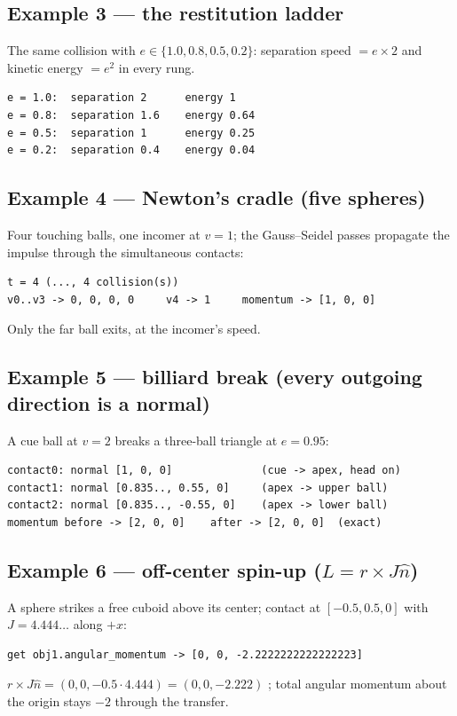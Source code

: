\documentclass[11pt]{article}
\begin{document}
\subsection{Example 3 --- the restitution ladder}
The same collision with $e \in \{1.0, 0.8, 0.5, 0.2\}$: separation speed
$= e \times 2$ and kinetic energy $= e^2$ in every rung.
\begin{lstlisting}
e = 1.0:  separation 2      energy 1
e = 0.8:  separation 1.6    energy 0.64
e = 0.5:  separation 1      energy 0.25
e = 0.2:  separation 0.4    energy 0.04
\end{lstlisting}

\subsection{Example 4 --- Newton's cradle (five spheres)}
Four touching balls, one incomer at $v = 1$; the Gauss--Seidel passes propagate
the impulse through the simultaneous contacts:
\begin{lstlisting}
t = 4 (..., 4 collision(s))
v0..v3 -> 0, 0, 0, 0     v4 -> 1     momentum -> [1, 0, 0]
\end{lstlisting}
Only the far ball exits, at the incomer's speed.

\subsection{Example 5 --- billiard break (every outgoing direction is a normal)}
A cue ball at $v = 2$ breaks a three-ball triangle at $e = 0.95$:
\begin{lstlisting}
contact0: normal [1, 0, 0]              (cue -> apex, head on)
contact1: normal [0.835.., 0.55, 0]     (apex -> upper ball)
contact2: normal [0.835.., -0.55, 0]    (apex -> lower ball)
momentum before -> [2, 0, 0]    after -> [2, 0, 0]  (exact)
\end{lstlisting}

\subsection{Example 6 --- off-center spin-up ($L = r \times J\hat n$)}
A sphere strikes a free cuboid above its center; contact at
$[-0.5, 0.5, 0]$ with $J = 4.444\ldots$ along $+x$:
\begin{lstlisting}
get obj1.angular_momentum -> [0, 0, -2.2222222222222223]
\end{lstlisting}
$r \times J\hat n = (0, 0, -0.5 \cdot 4.444) = (0, 0, -2.222)$ \checkmark;
total angular momentum about the origin stays $-2$ through the transfer.
\end{document}
